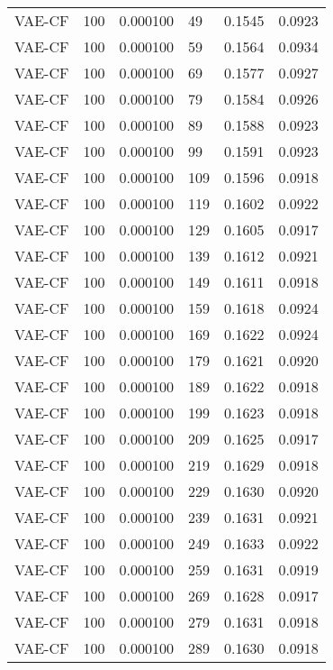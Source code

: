 \begin{tabular}{llrlrr}
  VAE-CF &  100 &  0.000100 &    49 &  0.1545 &       0.0923 \\
  VAE-CF &  100 &  0.000100 &    59 &  0.1564 &       0.0934 \\
  VAE-CF &  100 &  0.000100 &    69 &  0.1577 &       0.0927 \\
  VAE-CF &  100 &  0.000100 &    79 &  0.1584 &       0.0926 \\
  VAE-CF &  100 &  0.000100 &    89 &  0.1588 &       0.0923 \\
  VAE-CF &  100 &  0.000100 &    99 &  0.1591 &       0.0923 \\
  VAE-CF &  100 &  0.000100 &   109 &  0.1596 &       0.0918 \\
  VAE-CF &  100 &  0.000100 &   119 &  0.1602 &       0.0922 \\
  VAE-CF &  100 &  0.000100 &   129 &  0.1605 &       0.0917 \\
  VAE-CF &  100 &  0.000100 &   139 &  0.1612 &       0.0921 \\
  VAE-CF &  100 &  0.000100 &   149 &  0.1611 &       0.0918 \\
  VAE-CF &  100 &  0.000100 &   159 &  0.1618 &       0.0924 \\
  VAE-CF &  100 &  0.000100 &   169 &  0.1622 &       0.0924 \\
  VAE-CF &  100 &  0.000100 &   179 &  0.1621 &       0.0920 \\
  VAE-CF &  100 &  0.000100 &   189 &  0.1622 &       0.0918 \\
  VAE-CF &  100 &  0.000100 &   199 &  0.1623 &       0.0918 \\
  VAE-CF &  100 &  0.000100 &   209 &  0.1625 &       0.0917 \\
  VAE-CF &  100 &  0.000100 &   219 &  0.1629 &       0.0918 \\
  VAE-CF &  100 &  0.000100 &   229 &  0.1630 &       0.0920 \\
  VAE-CF &  100 &  0.000100 &   239 &  0.1631 &       0.0921 \\
  VAE-CF &  100 &  0.000100 &   249 &  0.1633 &       0.0922 \\
  VAE-CF &  100 &  0.000100 &   259 &  0.1631 &       0.0919 \\
  VAE-CF &  100 &  0.000100 &   269 &  0.1628 &       0.0917 \\
  VAE-CF &  100 &  0.000100 &   279 &  0.1631 &       0.0918 \\
  VAE-CF &  100 &  0.000100 &   289 &  0.1630 &       0.0918 \\

\end{tabular}

